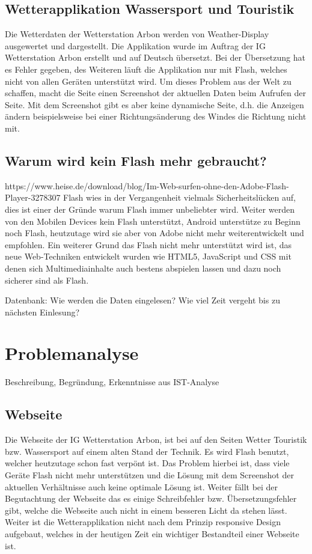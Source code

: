 \documentclass[a4paper,ngerman, 12pt]{report}
\begin{document}
\subsection{Wetterapplikation Wassersport und Touristik}
Die Wetterdaten der Wetterstation Arbon werden von Weather-Display ausgewertet und dargestellt. Die Applikation wurde im Auftrag der IG Wetterstation Arbon erstellt und auf Deutsch übersetzt. Bei der Übersetzung hat es Fehler gegeben, des Weiteren läuft die Applikation nur mit Flash, welches nicht von allen Geräten unterstützt wird. Um dieses Problem aus der Welt zu schaffen, macht die Seite einen Screenshot der aktuellen Daten beim Aufrufen der Seite. Mit dem Screenshot gibt es aber keine dynamische Seite, d.h. die Anzeigen ändern beispielsweise bei einer Richtungsänderung des Windes die Richtung nicht mit. 

\subsection{Warum wird kein Flash mehr gebraucht?}
  
https://www.heise.de/download/blog/Im-Web-surfen-ohne-den-Adobe-Flash-Player-3278307
Flash wies in der Vergangenheit vielmals Sicherheitslücken auf, dies ist einer der Gründe warum Flash immer unbeliebter wird. Weiter werden von den Mobilen Devices kein Flash unterstützt, Android unterstütze zu Beginn noch Flash, heutzutage wird sie aber von Adobe nicht mehr weiterentwickelt und empfohlen. Ein weiterer Grund das Flash nicht mehr unterstützt wird ist, das neue Web-Techniken entwickelt wurden wie HTML5, JavaScript und CSS mit denen sich Multimediainhalte auch bestens abspielen lassen und dazu noch sicherer sind als Flash.




Datenbank: Wie werden die Daten eingelesen? Wie viel Zeit vergeht bis zu nächsten Einlesung?
  

\section{Problemanalyse}
Beschreibung, 
Begründung, 
Erkenntnisse aus IST-Analyse

\subsection{Webseite}
Die Webseite der IG Wetterstation Arbon, ist bei auf den Seiten Wetter Touristik bzw. Wassersport auf einem alten Stand der Technik. Es wird Flash benutzt, welcher heutzutage schon fast verpönt ist. Das Problem hierbei ist, dass viele Geräte Flash nicht mehr unterstützen und die Lösung mit dem Screenshot der aktuellen Verhältnisse auch keine optimale Lösung ist. Weiter fällt bei der Begutachtung der Webseite das es einige Schreibfehler bzw. Übersetzungsfehler gibt, welche die Webseite auch nicht in einem besseren Licht da stehen lässt. Weiter ist die Wetterapplikation nicht nach dem Prinzip responsive Design aufgebaut, welches in der heutigen Zeit ein wichtiger Bestandteil einer Webseite ist. 
\end{document}
